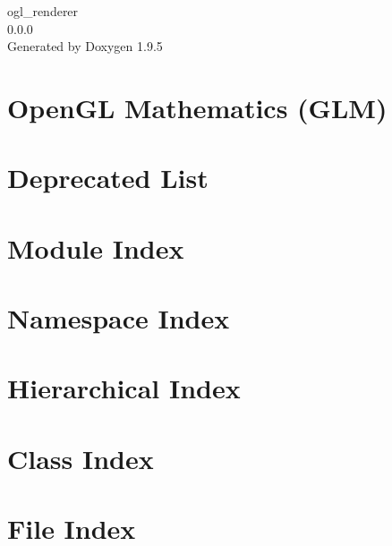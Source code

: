 \documentclass[twoside]{book}
\newcommand{\+}{\discretionary{\mbox{\scriptsize$\hookleftarrow$}}{}{}}
\newcommand{\clearemptydoublepage}{%
    \newpage{\pagestyle{empty}\cleardoublepage}%
  }
\begin{document}
  \raggedbottom
    \hypersetup{pageanchor=false,
                bookmarksnumbered=true,
                pdfencoding=unicode
               }
  \begin{titlepage}
  \vspace*{7cm}
  \begin{center}%
  {\Large ogl\+\_\+renderer}\\
  [1ex]\large 0.\+0.\+0 \\
  \vspace*{1cm}
  {\large Generated by Doxygen 1.9.5}\\
  \end{center}
  \end{titlepage}
  \clearemptydoublepage
  \tableofcontents
  \clearemptydoublepage
  \hypersetup{pageanchor=true}
\chapter{Open\+GL Mathematics (GLM)}
\label{index}\hypertarget{index}{}
\chapter{Deprecated List}
\label{deprecated}

\chapter{Module Index}

\chapter{Namespace Index}

\chapter{Hierarchical Index}

\chapter{Class Index}

\chapter{File Index}

\end{document}
